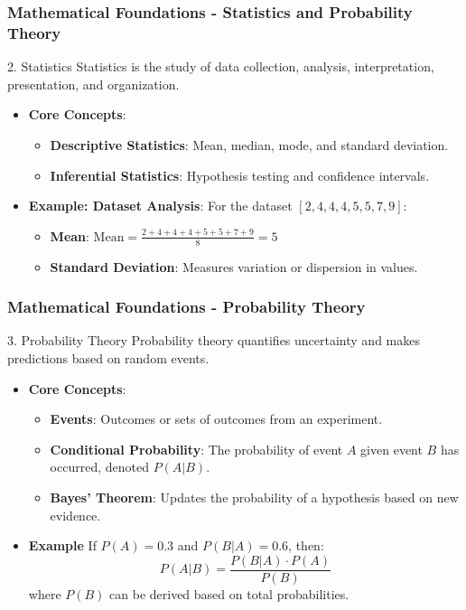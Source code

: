 \documentclass{beamer}
\begin{document}
\begin{frame}[fragile]
    \frametitle{Mathematical Foundations - Statistics and Probability Theory}
    \begin{block}{2. Statistics}
        Statistics is the study of data collection, analysis, interpretation, presentation, and organization.
    \end{block}
    
    \begin{itemize}
        \item \textbf{Core Concepts}:
        \begin{itemize}
            \item \textbf{Descriptive Statistics}: Mean, median, mode, and standard deviation.
            \item \textbf{Inferential Statistics}: Hypothesis testing and confidence intervals.
        \end{itemize}

        \item \textbf{Example: Dataset Analysis}:
        For the dataset \( [2, 4, 4, 4, 5, 5, 7, 9] \):
        \begin{itemize}
            \item \textbf{Mean}: \( \text{Mean} = \frac{2 + 4 + 4 + 4 + 5 + 5 + 7 + 9}{8} = 5 \)
            \item \textbf{Standard Deviation}: Measures variation or dispersion in values.
        \end{itemize}
    \end{itemize}
\end{frame}

\begin{frame}[fragile]
    \frametitle{Mathematical Foundations - Probability Theory}
    \begin{block}{3. Probability Theory}
        Probability theory quantifies uncertainty and makes predictions based on random events.
    \end{block}
    
    \begin{itemize}
        \item \textbf{Core Concepts}:
        \begin{itemize}
            \item \textbf{Events}: Outcomes or sets of outcomes from an experiment.
            \item \textbf{Conditional Probability}: The probability of event \( A \) given event \( B \) has occurred, denoted \( P(A|B) \).
            \item \textbf{Bayes' Theorem}: Updates the probability of a hypothesis based on new evidence.
        \end{itemize}
        
        \item \textbf{Example}\newline
        If \( P(A) = 0.3 \) and \( P(B|A) = 0.6 \), then:
        \[
        P(A|B) = \frac{P(B|A) \cdot P(A)}{P(B)}
        \]
        where \( P(B) \) can be derived based on total probabilities.
    \end{itemize}
\end{frame}
\end{document}
